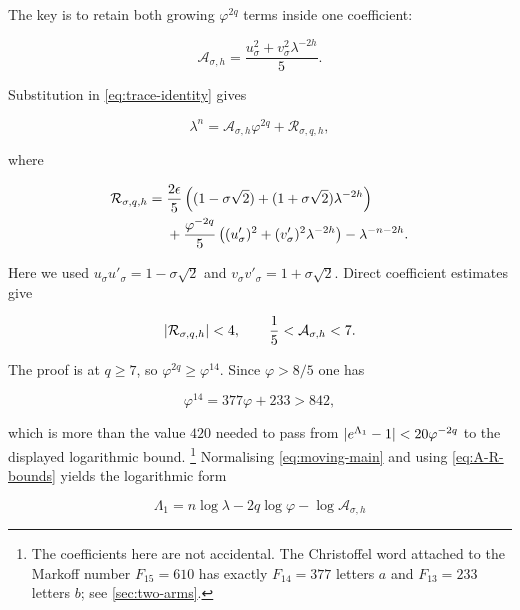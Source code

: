 The key is to retain both growing $\varphi^{2q}$ terms inside one
coefficient:

\begin{equation}
 \mathcal A_{\sigma,h}
 =\frac{u_\sigma^2+v_\sigma^2\lambda^{-2h}}5.
 \label{eq:moving-coefficient}
\end{equation}

Substitution in \cref{eq:trace-identity} gives

\begin{equation}
 \lambda^n=\mathcal A_{\sigma,h}\varphi^{2q}
 +\mathcal R_{\sigma,q,h},
 \label{eq:moving-main}
\end{equation}

where

\begin{align}
 \mathcal R_{\sigma,q,h}={}&
 \frac{2\epsilon}{5}
 \left((1-\sigma\sqrt2)
 +(1+\sigma\sqrt2)\lambda^{-2h}\right)
 \notag\\
 &+\frac{\varphi^{-2q}}5
 \left((u'_\sigma)^2+(v'_\sigma)^2\lambda^{-2h}\right)
 -\lambda^{-n-2h}.
 \label{eq:moving-remainder}
\end{align}

Here we used
$u_\sigma u'_\sigma=1-\sigma\sqrt2$ and
$v_\sigma v'_\sigma=1+\sigma\sqrt2$. Direct coefficient estimates give

\begin{equation}
 \lvert\mathcal R_{\sigma,q,h}\rvert<4,
 \qquad
 \frac15<\mathcal A_{\sigma,h}<7.
 \label{eq:A-R-bounds}
\end{equation}

The proof is at $q\geqslant7$, so $\varphi^{2q}\geqslant\varphi^{14}$. Since
$\varphi>8/5$ one has

\begin{equation}
 \varphi^{14}=377\varphi+233>842,
 \label{eq:phi14}
\end{equation}

which is more than the value $420$ needed to pass from
$\lvert e^{\Lambda_1}-1\rvert<20\varphi^{-2q}$ to the displayed logarithmic bound.%
\footnote{The coefficients here are not accidental. The Christoffel word
attached to the Markoff number $F_{15}=610$ has exactly $F_{14}=377$ letters
$a$ and $F_{13}=233$ letters $b$; see \cref{sec:two-arms}.}
Normalising \cref{eq:moving-main} and using \cref{eq:A-R-bounds} yields the
logarithmic form

\begin{equation}
 \Lambda_1=n\log\lambda-2q\log\varphi
 -\log\mathcal A_{\sigma,h}
 \label{eq:Lambda1}
\end{equation}

